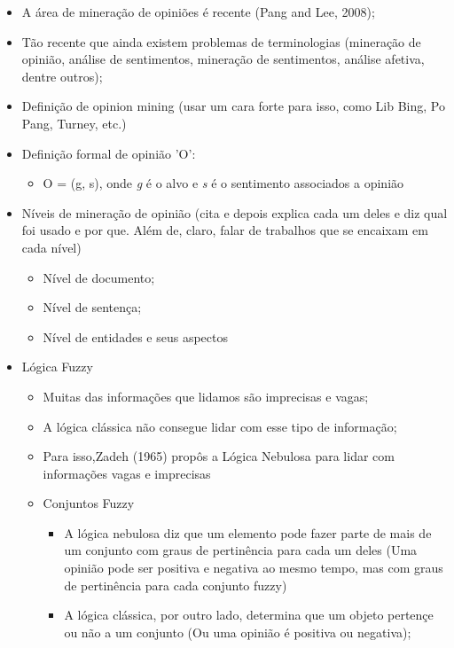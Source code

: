 \documentclass[msc, a4paper, classic, pt]{ufbathesis}
\begin{document}

\begin{itemize}
\item A área de mineração de opiniões é recente (Pang and Lee, 2008);
\item Tão recente que ainda existem problemas de terminologias (mineração de opinião, análise de sentimentos, mineração de sentimentos, análise afetiva, dentre outros);
\item Definição de opinion mining (usar um cara forte para isso, como Lib Bing, Po Pang, Turney, etc.)

\item Definição formal de opinião 'O':
\begin{itemize}
\item O = (g, s), onde \emph{g} é o alvo e \emph{s} é o sentimento associados a opinião
\end{itemize}

\item Níveis de mineração de opinião (cita e depois explica cada um deles e diz qual foi usado e por que. Além de, claro, falar de trabalhos que se encaixam em cada nível)
\begin{itemize}
\item Nível de documento;
\item Nível de sentença;
\item Nível de entidades e seus aspectos
\end{itemize}

\item Lógica Fuzzy
\begin{itemize}
\item Muitas das informações que lidamos são imprecisas e vagas;
\item A lógica clássica não consegue lidar com esse tipo de informação;
\item Para isso,Zadeh (1965) propôs a Lógica Nebulosa para lidar com informações vagas e imprecisas

\item Conjuntos Fuzzy
\begin{itemize}
\item A lógica nebulosa diz que um elemento pode fazer parte de mais de um conjunto com graus de pertinência para cada um deles (Uma opinião pode ser positiva e negativa ao mesmo tempo, mas com graus de pertinência para cada conjunto fuzzy)
\item A lógica clássica, por outro lado, determina que um objeto pertençe ou não a um conjunto (Ou uma opinião é positiva ou negativa);
\end{itemize}


\end{itemize}
\end{itemize}
\end{document}
